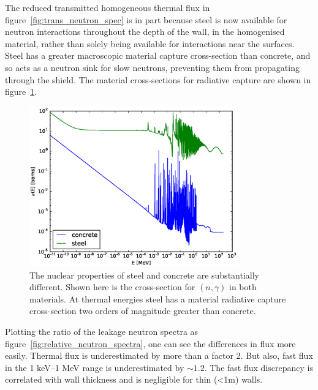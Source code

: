 The reduced transmitted homogeneous thermal flux in figure~\ref{fig:trans_neutron_spec} is in part because steel is now available for neutron interactions throughout the depth of the wall, in the homogenised material, rather than solely being available for interactions near the surfaces. Steel has a greater macroscopic material capture cross-section than concrete, and so acts as a neutron sink for slow neutrons, preventing them from propagating through the shield. The material cross-sections for radiative capture are shown in figure~\ref{fig:n_rad_capture}.

\begin{figure}[H]
  \centering
  \includegraphics[width=0.8\textwidth]{n_rad_capture}
  \caption{The nuclear properties of steel and concrete are substantially different. Shown here is the cross-section for $(n,\gamma)$ in both materials. At thermal energies steel has a material radiative capture cross-section two orders of magnitude greater than concrete.}
  \label{fig:n_rad_capture}
\end{figure}

Plotting the ratio of the leakage neutron spectra as figure~\ref{fig:relative_neutron_spectra}, one can see the differences in flux more easily. Thermal flux is underestimated by more than a factor 2. But also, fast flux in the 1 keV--1 MeV range is underestimated by $\sim1.2$. The fast flux discrepancy is correlated with wall thickness and is negligible for thin (\textless 1m) walls.

